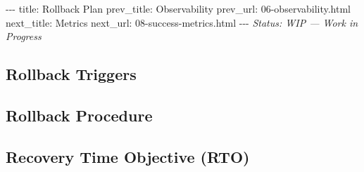 \documentclass[12pt,a4paper]{article}
\begin{document}
-\/-\/- title: Rollback Plan prev\_title: Observability prev\_url:
06-observability.html next\_title: Metrics next\_url:
08-success-metrics.html -\/-\/- \emph{Status: WIP --- Work in Progress}

\subsection{Rollback Triggers}\label{rollback-triggers}

\subsection{Rollback Procedure}\label{rollback-procedure}

\subsection{Recovery Time Objective
(RTO)}\label{recovery-time-objective-rto}
\end{document}
